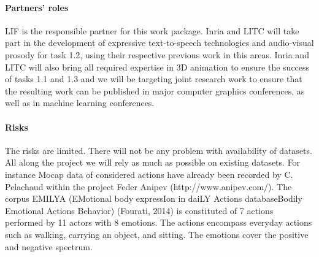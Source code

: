 \paragraph{Partners' roles}

LIF is the responsible partner for this work package. Inria and LITC will take part in the development of expressive  text-to-speech technologies and audio-visual prosody
for task 1.2, using their respective previous work in this areas. Inria and LITC will also bring all required expertise in 3D animation to ensure the success of  tasks 1.1 and 1.3
and we will be targeting joint research work to ensure that the resulting work can be published in major computer graphics conferences, as well as in machine learning conferences.

\paragraph{Risks}

The risks are limited. There will not be any problem with availability of datasets. All along the project we will rely as much as possible on existing datasets. For instance Mocap data of considered actions have already been recorded by C. Pelachaud within the project Feder Anipev (http://www.anipev.com/). 
The corpus EMILYA (EMotional body expressIon in daiLY Actions databaseBodily Emotional Actions Behavior) (Fourati, 2014) is constituted of 7 actions performed by 11 actors with 8 emotions. The actions encompass everyday actions such as walking, carrying an object, and sitting. 
The emotions cover the positive and negative spectrum.



\endinput